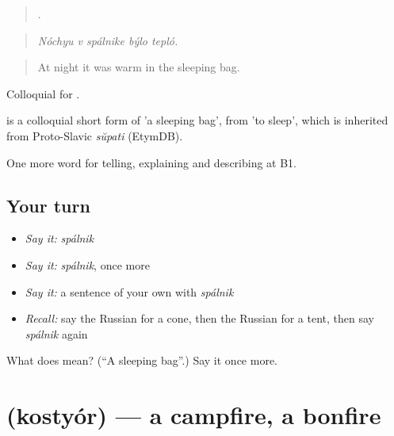 \begin{quote}
    .
\end{quote}

\begin{quote}
\emph{Nóchyu v spálnike býlo tepló.}
\end{quote}

\begin{quote}
At night it was warm in the sleeping bag.
\end{quote}

Colloquial for \emph{ }.

\begin{cousinweb}
\emph{} is a colloquial short form of \emph{ } 'a sleeping bag', from \emph{} 'to sleep', which is inherited from Proto-Slavic \emph{sŭpati} (EtymDB).
\end{cousinweb}

\begin{grammarlens}[title={What you've built}]
One more word for telling, explaining and describing at B1.
\end{grammarlens}

\subsection*{Your turn}
\begin{itemize}
\raggedright
  \item \emph{Say it:} \emph{spálnik}
  \item \emph{Say it:} \emph{spálnik}, once more
  \item \emph{Say it:} a sentence of your own with \emph{spálnik}
  \item \emph{Recall:} say the Russian for a cone, then the Russian for a tent, then say \emph{spálnik} again
\end{itemize}

\begin{tcolorbox}[breakable,colback=teal!4,colframe=teal!35!black,title={Before you move on}]
What does  mean? (\textquotedblleft{}A sleeping bag\textquotedblright{}.) Say it once more.
\end{tcolorbox}
\section[\texorpdfstring{\ru{костёр} (kostyór)}{костёр (kostyór)}]{ (kostyór) — a campfire, a bonfire}

